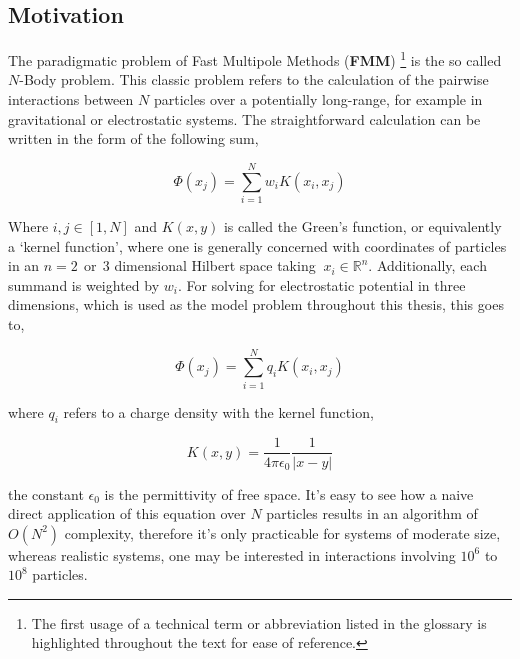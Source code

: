 \subsection{Motivation}

The paradigmatic problem of Fast Multipole Methods (\textbf{\gls{FMM}})
\footnote{The first usage of a technical term or abbreviation listed in the
glossary is highlighted throughout the text for ease of reference.} is the so
called $N$-Body problem. This classic problem refers to the calculation of the pairwise
interactions between $N$ particles over a potentially long-range, for example in
gravitational or electrostatic systems. The straightforward calculation can be
written in the form of the following sum,

\begin{equation}
\Phi(x_j) = \sum_{i=1}^N w_i K(x_i, x_j)
\label{eq:n_body_problem}
\end{equation}

Where $i, j \in [1,N]$ and $K(x, y)$ is called the Green's function, or equivalently
a `kernel function', where one is generally concerned with coordinates of particles in an
$n=2 \> \> \text{or} \> \> 3$ dimensional Hilbert space taking  $\ x_i \in \mathbb{R}^n$.
Additionally, each summand is weighted by $w_i$. For solving for electrostatic
potential in three dimensions, which is used as the model problem throughout this
thesis, this goes to,

\begin{equation}
\Phi(x_j) = \sum_{i=1}^N q_iK(x_i, x_j)
\label{eq:electrostatic_paradigm}
\end{equation}

where $q_i$ refers to a charge density with the kernel function,

\begin{equation}
    K(x, y) = \frac{1}{4\pi \epsilon_0}\frac{1}{| x - y |}
\label{eq:laplace_kernel}
\end{equation}

the constant $\epsilon_0$ is the permittivity of free space. It's easy to see
how a naive direct application of this equation over $N$ particles
results in an algorithm of $O(N^2)$ complexity, therefore it's only practicable
for systems of moderate size, whereas realistic systems, one may be interested in
interactions involving $10^{6}$ to $10^8$ particles.

